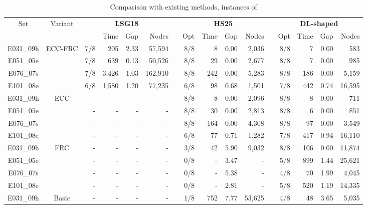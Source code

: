 \documentclass{article}
\newcommand{\tighttable}{%
  \setlength{\tabcolsep}{3pt}        %
  \renewcommand{\arraystretch}{1} %
}
\begin{document}
\begin{table}[htbp]
    \caption{Comparison with existing methods, instances of \cite{louveaux2018exact}}
    \label{tab:louveaux}
    \centering
    \small
    \tighttable
    \setlength{\tabcolsep}{2pt}
    \begin{tabular*}{\textwidth}{@{\extracolsep{\fill}}ccrrrrrrrrrrrrrr}
    \toprule
    \multirow{2}{*}{Set} & \multirow{2}{*}{Variant} & \multicolumn{4}{c}{\textbf{LSG18}} &  & \multicolumn{4}{c}{\textbf{HS25}} &  & \multicolumn{4}{c}{\textbf{DL-shaped}} \\ \cmidrule{3-6} \cmidrule{8-11} \cmidrule{13-16} 
     &  &  & Time & Gap & Nodes &  & Opt & Time & Gap & Nodes &  & Opt & Time & Gap & Nodes \\ \hline
    E031\_09h & \multirow{4}{*}{ECC-FRC} & 7/8 & 205 & 2.33 & 57,594 &  & 8/8 & 8 & 0.00 & 2,036 &  & 8/8 & 7 & 0.00 & 583 \\
    E051\_05e &  & 7/8 & 639 & 0.13 & 50,526 &  & 8/8 & 29 & 0.00 & 2,677 &  & 8/8 & 7 & 0.00 & 985 \\
    E076\_07s &  & 7/8 & 3,426 & 1.03 & 162,910 &  & 8/8 & 242 & 0.00 & 5,283 &  & 8/8 & 186 & 0.00 & 5,159 \\
    E101\_08e &  & 6/8 & 1,580 & 1.20 & 77,235 &  & 6/8 & 98 & 0.68 & 1,501 &  & 7/8 & 442 & 0.74 & 16,595 \\ \hline
    E031\_09h & \multirow{4}{*}{ECC} & - & - & - & - &  & 8/8 & 8 & 0.00 & 2,096 &  & 8/8 & 8 & 0.00 & 711 \\
    E051\_05e &  & - & - & - & - &  & 8/8 & 30 & 0.00 & 2,813 &  & 8/8 & 6 & 0.00 & 851 \\
    E076\_07s &  & - & - & - & - &  & 8/8 & 164 & 0.00 & 4,308 &  & 8/8 & 97 & 0.00 & 3,549 \\
    E101\_08e &  & - & - & - & - &  & 6/8 & 77 & 0.71 & 1,282 &  & 7/8 & 417 & 0.94 & 16,110 \\ \hline
    E031\_09h & \multirow{4}{*}{FRC} & - & - & - & - &  & 3/8 & 42 & 5.90 & 9,032 &  & 8/8 & 106 & 0.00 & 11,874 \\
    E051\_05e &  & - & - & - & - &  & 0/8 & - & 3.47 & - &  & 5/8 & 899 & 1.44 & 25,621 \\
    E076\_07s &  & - & - & - & - &  & 0/8 & - & 5.38 & - &  & 4/8 & 70 & 1.99 & 4,045 \\
    E101\_08e &  & - & - & - & - &  & 0/8 & - & 2.81 & - &  & 5/8 & 520 & 1.19 & 14,335 \\ \hline
    E031\_09h & \multirow{4}{*}{Basic} & - & - & - & - &  & 1/8 & 752 & 7.77 & 53,625 &  & 4/8 & 48 & 3.65 & 5,035 \\

\end{tabular*}
\end{table}
\end{document}
